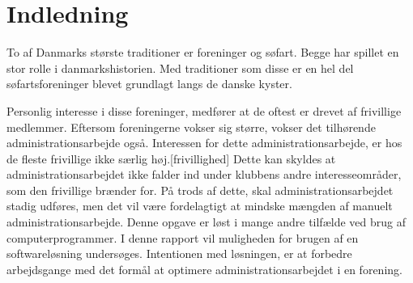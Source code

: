 \chapter{Indledning}




To af Danmarks største traditioner er foreninger og søfart. Begge har spillet en stor rolle i danmarkshistorien. Med traditioner som disse er en hel del søfartsforeninger blevet grundlagt langs de danske kyster. 

Personlig interesse i disse foreninger, medfører at de oftest er drevet af frivillige medlemmer. Eftersom foreningerne vokser sig større, vokser det tilhørende administrationsarbejde også. Interessen for dette administrationsarbejde, er hos de fleste frivillige ikke særlig høj.[frivillighed] Dette kan skyldes at administrationsarbejdet ikke falder ind under klubbens andre interesseområder, som den frivillige brænder for. På trods af dette, skal administrationsarbejdet stadig udføres, men det vil være fordelagtigt at mindske mængden af manuelt administrationsarbejde. Denne opgave er løst i mange andre tilfælde ved brug af computerprogrammer. I denne rapport vil muligheden for brugen af en softwareløsning undersøges. Intentionen med løsningen, er at forbedre arbejdsgange med det formål at optimere administrationsarbejdet i en forening.



